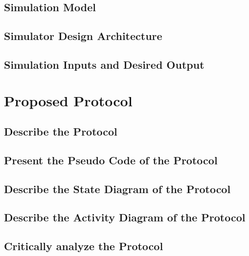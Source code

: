 \documentclass[10pt]{llncs}
\begin{document}
\subsection{Simulation Model}


%
\subsection{Simulator Design Architecture}


%
\subsection{Simulation Inputs and Desired Output}


%
\section{Proposed Protocol}

%
\subsection{Describe the Protocol}

%
\subsection{Present the Pseudo Code of the Protocol}

%
\subsection{Describe the State Diagram of the Protocol}

%
\subsection{Describe the Activity Diagram of the Protocol}


%
\subsection{Critically analyze the Protocol}
\end{document}
